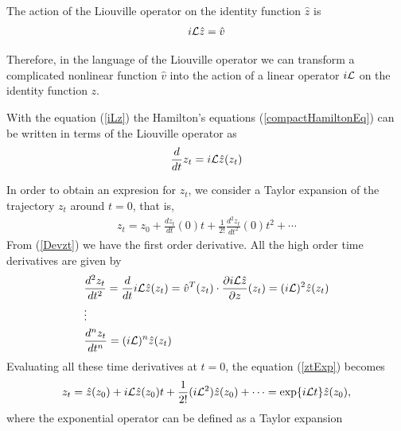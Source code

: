 \documentclass[b5paper,openright,10pt]{book}
\begin{document}

The action of the Liouville operator on the identity function $\hat{z}$ is
\begin{align}
  i{\cal L} \hat{z} = \hat{v}
  \label{iLz}
\end{align}

Therefore, in the language of the Liouville operator we can transform a complicated nonlinear function $\hat{v}$ into the action of a linear operator $i{\cal L}$ on the identity function $z$.

With the equation (\ref{iLz}) the Hamilton's equations (\ref{compactHamiltonEq}) can be written in terms of the Liouville operator as
\begin{align}
  \frac{d}{dt}z_t=i{\cal L}\hat{z}(z_t)
  \label{Devzt}
\end{align}

In order to obtain an expresion for $z_t$, we consider a Taylor expansion of the trajectory $z_t$ around $t=0$, that is,
\begin{align}
    z_t=z_0+\frac{dz_t}{dt}(0)t+\frac{1}{2!}\frac{d^2z_t}{dt^2}(0)t^2+\cdots
    \label{ztExp}
\end{align}
From (\ref{Devzt}) we have the first order derivative. All the high order time derivatives are given by
%
\begin{align}
    &\frac{d^2z_t}{dt^2} = \frac{d}{dt}i{\cal L}\hat{z}(z_t)
    =\hat{v}^T(z_t)\cdot\frac{\partial i{\cal L}\hat{z}}{\partial z}(z_t)
    =(i{\cal L})^2\hat{z}(z_t) \nonumber \\ 
    &\vdots \nonumber \\ 
    &\frac{d^n z_t}{dt^n} =(i{\cal L})^n\hat{z}(z_t)
\end{align}
%
Evaluating all these time derivatives at $t=0$, the equation (\ref{ztExp}) becomes
\begin{align}
    z_t=\hat{z}(z_0)+i{\cal L}\hat{z}(z_0)t
    +\frac{1}{2!}(i{\cal L}^2)\hat{z}(z_0)
    +\cdots
    ={\rm exp}\{i{\cal L}t\}\hat{z}(z_0),
    \label{zt1}
\end{align}
where the exponential operator can be defined as a Taylor expansion
\end{document}
